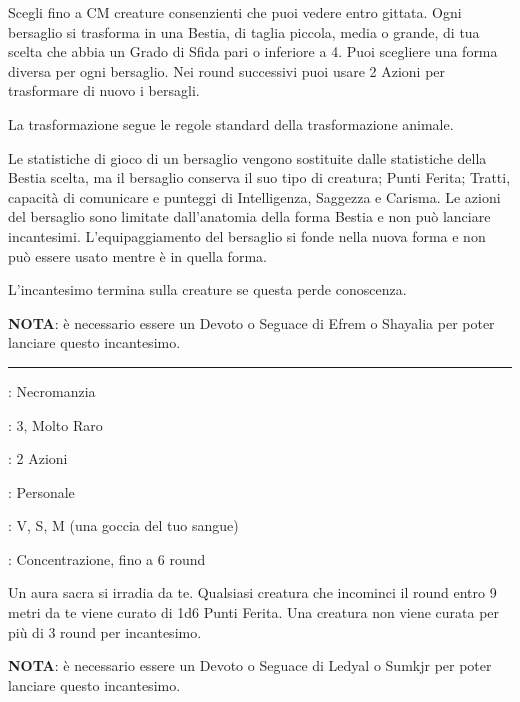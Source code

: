 \begin{multicols}{2}
Scegli fino a CM creature consenzienti che puoi vedere entro gittata. Ogni bersaglio si trasforma in una Bestia, di taglia piccola, media o grande, di tua scelta che abbia un Grado di Sfida pari o inferiore a 4. Puoi scegliere una forma diversa per ogni bersaglio. Nei round successivi puoi usare 2 Azioni per trasformare di nuovo i bersagli.

La trasformazione segue le regole standard della trasformazione animale.

Le statistiche di gioco di un bersaglio vengono sostituite dalle statistiche della Bestia scelta, ma il bersaglio conserva il suo tipo di creatura; Punti Ferita; Tratti, capacità di comunicare e punteggi di Intelligenza, Saggezza e Carisma. Le azioni del bersaglio sono limitate dall'anatomia della forma Bestia e non può lanciare incantesimi. L'equipaggiamento del bersaglio si fonde nella nuova forma e non può essere usato mentre è in quella forma.

L'incantesimo termina sulla creature se questa perde conoscenza.

\textbf{NOTA}: è necessario essere un Devoto o Seguace di Efrem o Shayalia per poter lanciare questo incantesimo.

\smallskip\noindent\rule{\linewidth}{2pt} \hypertarget{Benedizione di Ledyal}{}\smallskip{}\label{Aura of Vitality}
\noindent
\begin{description}[noitemsep, topsep=0pt, parsep=0pt, partopsep=0pt, leftmargin=0cm, labelwidth=2.8cm]
	\item[\textbf{Lista di Magia}] : Necromanzia
	\item[\textbf{Livello}] : 3, Molto Raro
	\item[\textbf{T. di Lancio}] : 2 Azioni
	\item[\textbf{Gittata}] : Personale
	\item[\textbf{Componenti}] : V, S, M (una goccia del tuo sangue)
	\item[\textbf{Durata}] : Concentrazione, fino a 6 round
\end{description}

Un aura sacra si irradia da te. Qualsiasi creatura che incominci il round entro 9 metri da te viene curato di 1d6 Punti Ferita. Una creatura non viene curata per più di 3 round per incantesimo.

\textbf{NOTA}: è necessario essere un Devoto o Seguace di Ledyal o Sumkjr per poter lanciare questo incantesimo.


\end{multicols}
